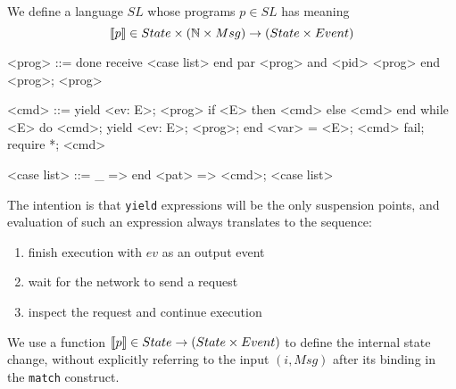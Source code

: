 \documentclass[acmsmall,review,anonymous]{acmart}\settopmatter{printfolios=true}
\begin{document}
We define a language $SL$ whose programs $p\in SL$ has meaning \[\semfunc[p] \in State \times (\mathbb{N} \times Msg) \rightarrow (State \times Event)\]

\begin{grammar}
    <prog> ::= done
         \alt receive <case list> end   %
         \alt par <prog> and <pid> <prog> end
         \alt <prog>; <prog>

	<cmd> ::= yield <ev: E>; <prog>                 %
         \alt if <E> then <cmd> else <cmd> end   %
         \alt while <E> do <cmd>; yield <ev: E>; <prog>; end    %
         \alt <var> = <E>; <cmd>
         \alt fail;
         \alt require *; <cmd>

    <case list> ::= \_ => end
        \alt <pat> => <cmd>; <case list>
\end{grammar}

The intention is that \texttt{yield} expressions will be the only suspension points, and evaluation of such an expression always translates to the sequence:
\begin{enumerate}
\item finish execution with $ev$ as an output event
\item wait for the network to send a request
\item inspect the request and continue execution
\end{enumerate}

We use a function $\semfunc[p] \in State \rightarrow (State \times Event)$ to define the internal state change, without explicitly referring to the input $(i, Msg)$ after its binding in the \texttt{match} construct.
\end{document}
